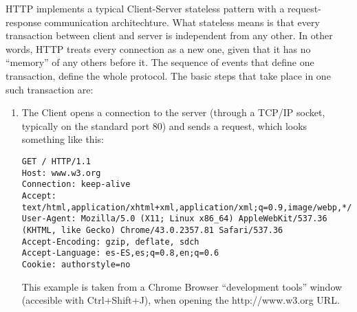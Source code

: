HTTP implements a typical Client-Server stateless pattern with a request-response communication architechture. What
stateless means is that every transaction between client and server is independent from any other. In other words,
HTTP treats every connection as a new one, given that it has no ``memory'' of any others before it. The sequence of
events that define one transaction, define the whole protocol. The basic steps that take place in one such transaction
are:
\begin{enumerate}
\item The Client opens a connection to the server (through a TCP/IP socket, typically on the standard port 80) and
sends a request, which looks something like this:
\begin{verbatim}
GET / HTTP/1.1
Host: www.w3.org
Connection: keep-alive
Accept: text/html,application/xhtml+xml,application/xml;q=0.9,image/webp,*/*;q=0.8
User-Agent: Mozilla/5.0 (X11; Linux x86_64) AppleWebKit/537.36 (KHTML, like Gecko) Chrome/43.0.2357.81 Safari/537.36
Accept-Encoding: gzip, deflate, sdch
Accept-Language: es-ES,es;q=0.8,en;q=0.6
Cookie: authorstyle=no
\end{verbatim}
This example is taken from a Chrome Browser ``development tools'' window (accesible with Ctrl+Shift+J), when opening
the http://www.w3.org URL.\\


\end{enumerate}
